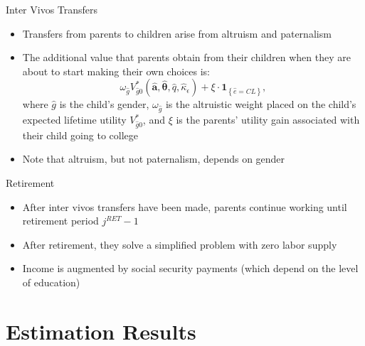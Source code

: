\documentclass{beamer}
\begin{document}
\begin{frame}{Inter Vivos Transfers}
\begin{itemize}
  \item Transfers from parents to children arise from altruism and paternalism
  \item The additional value that parents obtain from their children when they are about to 					start making their own choices is: 
  		$$\omega_{\hat{g}}V^{*}_{\hat{g}0}(\hat{\textbf{a}},\hat{\boldsymbol{\theta}},\hat{q},					\hat{\kappa}_{\epsilon})+\xi\cdot\textbf{1}_{\left\{\hat{e}=CL\right\}},$$
        where $\hat{g}$ is the child's gender, $\omega_{\hat{g}}$ is the altruistic weight placed on the 		 child's expected lifetime utility $V^{*}_{\hat{g}0}$, and $\xi$ is the parents' utility gain 			associated with their child going to college
  \item Note that altruism, but not paternalism, depends on gender
\end{itemize}      
\hyperlink{supplemental2}{}
\end{frame} 

\begin{frame}{Retirement}
\begin{itemize}
  \item After inter vivos transfers have been made, parents continue working until retirement period 			$j^{RET}-1$
  \item After retirement, they solve a simplified problem with zero labor supply
  \item Income is augmented by social security payments (which depend on the level of education)
\end{itemize}      
\end{frame} 



\section{Estimation Results}
\end{document}
